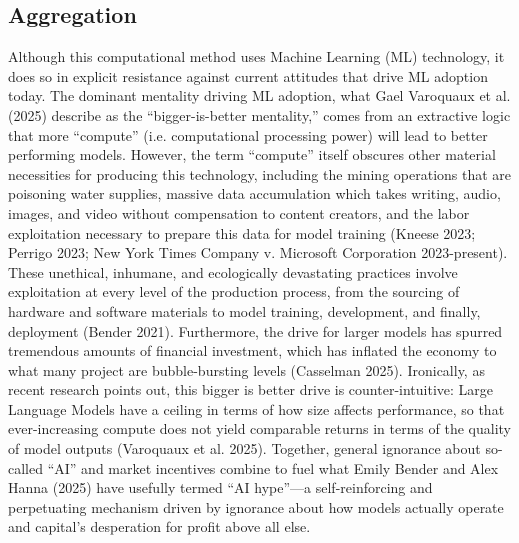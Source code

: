 \documentclass[11pt]{article}
\begin{document}
\subsection{Aggregation}
\label{sec:orgf79cc3d}
Although this computational method uses Machine Learning (ML)
technology, it does so in explicit resistance against current
attitudes that drive ML adoption today. The dominant mentality driving
ML adoption, what Gael Varoquaux et al. (2025) describe as the
“bigger-is-better mentality,” comes from an extractive logic that more
“compute” (i.e. computational processing power) will lead to better
performing models. However, the term “compute” itself obscures other
material necessities for producing this technology, including the
mining operations that are poisoning water supplies, massive data
accumulation which takes writing, audio, images, and video without
compensation to content creators, and the labor exploitation necessary
to prepare this data for model training (Kneese 2023; Perrigo 2023;
New York Times Company v. Microsoft Corporation 2023-present). These
unethical, inhumane, and ecologically devastating practices involve
exploitation at every level of the production process, from the
sourcing of hardware and software materials to model training,
development, and finally, deployment (Bender 2021). Furthermore, the
drive for larger models has spurred tremendous amounts of financial
investment, which has inflated the economy to what many project are
bubble-bursting levels (Casselman 2025). Ironically, as recent
research points out, this bigger is better drive is counter-intuitive:
Large Language Models have a ceiling in terms of how size affects
performance, so that ever-increasing compute does not yield comparable
returns in terms of the quality of model outputs (Varoquaux et al.
2025). Together, general ignorance about so-called “AI” and market
incentives combine to fuel what Emily Bender and Alex Hanna (2025)
have usefully termed “AI hype”—a self-reinforcing and perpetuating
mechanism driven by ignorance about how models actually operate and
capital’s desperation for profit above all else.
\end{document}
